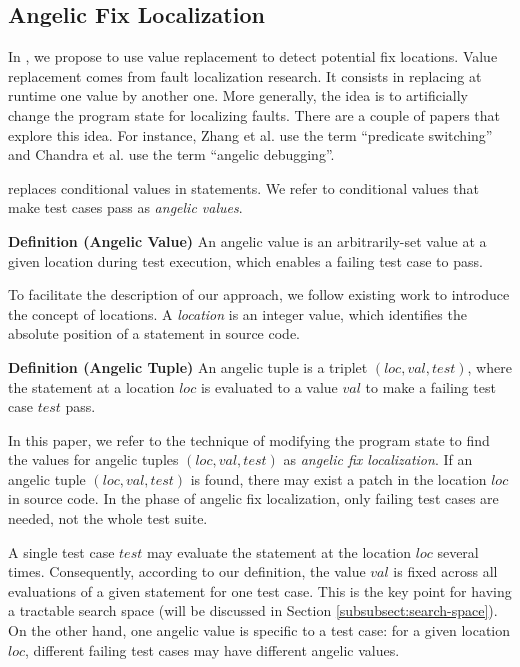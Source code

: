 \subsection{Angelic Fix Localization}
\label{sect:angelic-fix-localization}

In \nopol, we propose to use value replacement \cite{jeffrey2008fault} to detect potential fix locations.
Value replacement \cite{jeffrey2008fault} comes from fault localization research. It consists in replacing at runtime one value by another one. 
More generally, the idea is to artificially change the program state for localizing faults. 
There are a couple of papers that explore this idea. 
For instance, Zhang et al. \cite{zhang2006locating} use the term ``predicate switching'' and Chandra et al. \cite{chandra2011angelic} use the term ``angelic debugging''. 

\nopol replaces conditional values in \ourif statements. We refer to conditional values that make test cases pass as \emph{angelic values}. 

{\bf Definition (Angelic Value)}
An angelic value is an arbitrarily-set value at a given location during test execution, which enables a failing test case to pass. 

To facilitate the description of our approach, we follow existing work \cite{gulwani2011synthesis} to introduce the concept of locations. A \textit{location} is an integer value, which identifies the absolute position of a statement in source code.

{\bf Definition (Angelic Tuple)}
An angelic tuple is a triplet $(loc, val, test)$, where the statement at a location $loc$ is evaluated to a value $val$ to make a failing test case $test$ pass.

In this paper, we refer to the technique of modifying the program state to find the values for angelic tuples $(loc, val, test)$ as \emph{angelic fix localization}. If an angelic tuple $(loc, val, test)$ is found, there may exist a patch in the location $loc$ in source code. In the phase of angelic fix localization, only failing test cases are needed, not the whole test suite. 

A single test case $test$ may evaluate the statement at the location $loc$ several times. Consequently, according to our definition, the value $val$ is fixed across all evaluations of a given statement for one test case. This is the key point for having a tractable search space (will be discussed in Section \ref{subsubsect:search-space}). On the other hand, one angelic value is specific to a test case: for a given location $loc$, different failing test cases may have different angelic values.


